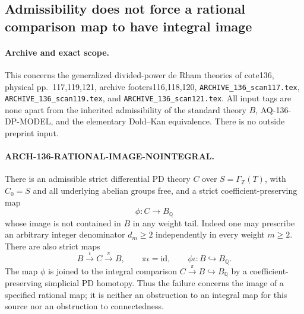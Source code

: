 \subsection{Admissibility does not force a rational comparison map to have integral image}
\label{arch136:rational-image}

\paragraph{Archive and exact scope.}
This concerns the generalized divided-power de Rham theories of
cote136, physical pp.~117,119,121, archive footers116,118,120,
\texttt{ARCHIVE\_136\_scan117.tex},
\texttt{ARCHIVE\_136\_scan119.tex}, and
\texttt{ARCHIVE\_136\_scan121.tex}.
All input tags are none apart from the inherited admissibility of
the standard theory \(B\), AQ-136-DP-MODEL, and the elementary
Dold--Kan equivalence. There is no outside preprint input.

\paragraph{ARCH-136-RATIONAL-IMAGE-NOINTEGRAL.}
There is an admissible strict differential PD theory \(C\) over
\(S=\Gamma_{\mathbb Z}(T)\), with \(C_0=S\) and all underlying
abelian groups free, and a strict coefficient-preserving map
\[
                         \phi:C\longrightarrow B_{\mathbb Q}
\]
whose image is not contained in \(B\) in any weight tail.
Indeed one may prescribe an arbitrary integer denominator
\(d_m\geq2\) independently in every weight \(m\geq2\).
There are also strict maps
\[
                 B\xrightarrow{\iota}C\xrightarrow{\pi}B,
                    \qquad \pi\iota=\mathrm{id},
                    \qquad \phi\iota:B\hookrightarrow B_{\mathbb Q}.
\]
The map \(\phi\) is joined to the integral comparison
\(C\xrightarrow{\pi}B\hookrightarrow B_{\mathbb Q}\)
by a coefficient-preserving simplicial PD homotopy.
Thus the failure concerns the image of a specified rational map;
it is neither an obstruction to an integral map for this source
nor an obstruction to connectedness.

